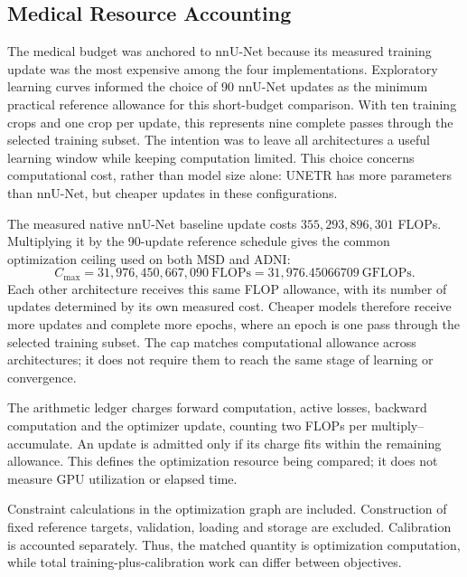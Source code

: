\documentclass[12pt,a4paper]{article}
\begin{document}
\subsection{Medical Resource Accounting}\label{sec:detailed-resource-accounting}

The medical budget was anchored to nnU-Net because its measured training
update was the most expensive among the four implementations. Exploratory
learning curves informed the choice of 90 nnU-Net updates as the minimum
practical reference allowance for this short-budget comparison. With ten
training crops and one crop per update, this represents nine complete
passes through the selected training subset. The intention was to leave
all architectures a useful learning window while keeping computation
limited. This choice concerns computational cost, rather than model size
alone: UNETR has more parameters than nnU-Net, but cheaper updates in
these configurations.

The measured native nnU-Net baseline update costs
$355{,}293{,}896{,}301$ FLOPs. Multiplying it by the 90-update reference
schedule gives the common optimization ceiling used on both MSD and ADNI:
\begin{equation}
 C_{\max}=31{,}976{,}450{,}667{,}090\ \mathrm{FLOPs}
          =31{,}976.45066709\ \mathrm{GFLOPs}.
\label{eq:main-numerical-cap}
\end{equation}
Each other architecture receives this same FLOP allowance, with its
number of updates determined by its own measured cost. Cheaper models
therefore receive more updates and complete more epochs, where an epoch
is one pass through the selected training subset. The cap matches
computational allowance across architectures; it does not require them
to reach the same stage of learning or convergence.

The arithmetic ledger charges forward computation, active losses,
backward computation and the optimizer update, counting two FLOPs per
multiply--accumulate. An update is admitted only if its charge fits
within the remaining allowance. This defines the optimization resource
being compared; it does not measure GPU utilization or elapsed time.

Constraint calculations in the optimization graph are included.
Construction of fixed reference targets, validation,
loading and storage are excluded. Calibration is accounted separately.
Thus, the matched quantity is optimization computation, while total
training-plus-calibration work can differ between objectives.
\end{document}
